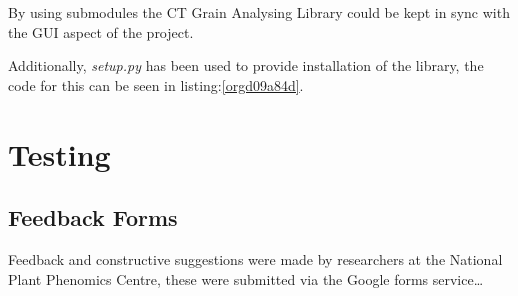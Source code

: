 \documentclass[11pt]{report}
\begin{document}
By using submodules the CT Grain Analysing Library could be kept in sync with the GUI aspect of the project.

Additionally, \emph{setup.py} has been used to provide installation of the library, the code for this can be seen in listing:\ref{orgd09a84d}.
\section{Testing}
\label{sec:org48b4e0e}
\subsection{Feedback Forms}
\label{sec:org902c110}
Feedback and constructive suggestions were made by researchers at the National Plant Phenomics Centre, these were submitted via the Google forms service\ldots{}
\end{document}
